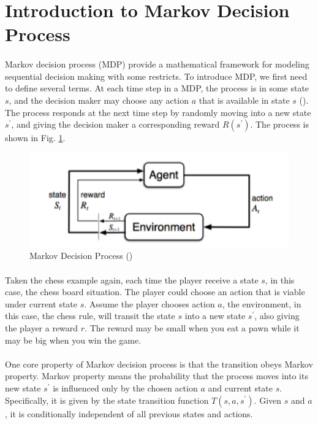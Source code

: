 \section{Introduction to Markov Decision Process}
\paragraph{}
Markov decision process (MDP) provide a mathematical framework for modeling sequential decision making with some restricts. To introduce MDP, we first need to define several terms. At each time step in a MDP, the process is in some state $s$, and the decision maker may choose any action $a$ that is available in state $s$ (\cite{bellman1957markovian}). The process responds at the next time step by randomly moving into a new state $s^{\prime}$, and giving the decision maker a corresponding reward $R(s^{\prime})$. The process is shown in Fig. \ref{fig:MDP}. 

\begin{figure}[ht]
\centering
\includegraphics[width=\columnwidth]{Figures/MDP}
\decoRule
\caption[Markov Decision Process]{Markov Decision Process (\cite{sutton1998introduction})}
\label{fig:MDP}
\end{figure}

\paragraph{}
Taken the chess example again, each time the player receive a state $s$, in this case, the chess board situation. The player could choose an action that is viable under current state $s$. Assume the player chooses action $a$, the environment, in this case, the chess rule, will transit the state $s$ into a new state $s^{\prime}$, also giving the player a reward $r$. The reward may be small when you eat a pawn while it may be big when you win the game. 
\paragraph{}
One core property of Markov decision process is that the transition obeys Markov property. Markov property means the probability that the process moves into its new state $s^{\prime}$ is influenced only by the chosen action $a$ and current state $s$. Specifically, it is given by the state transition function $T(s,a,s^{\prime})$. Given $s$ and $a$, it is conditionally independent of all previous states and actions. 
